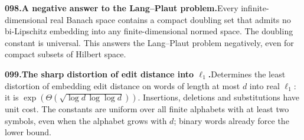 \documentclass[11pt,a4paper]{article}
\begin{document}
  \par \begin{minipage}{\linewidth}
  \fontsize{10.5}{12.6}\selectfont\RaggedRight
  \hypertarget{result 098}{}
  {\bfseries\textcolor{muted}{098.}\enspace A negative answer to the Lang--Plaut problem.}\enspace Every infinite-dimensional real Banach space contains a compact doubling set that admits no bi-Lipschitz embedding into any finite-dimensional normed space. The doubling constant is universal. This answers the Lang--Plaut problem negatively, even for compact subsets of Hilbert space.\par
  \end{minipage}\par\vspace{5pt}



  \par \begin{minipage}{\linewidth}
  \fontsize{10.5}{12.6}\selectfont\RaggedRight
  \hypertarget{result 099}{}
  {\bfseries\textcolor{muted}{099.}\enspace The sharp distortion of edit distance into $\ell_1$.}\enspace Determines the least distortion of embedding edit distance on words of length at most $d$ into real $\ell_1$: it is $\exp(\Theta(\sqrt{\log d\,\log\log d}))$. Insertions, deletions and substitutions have unit cost. The constants are uniform over all finite alphabets with at least two symbols, even when the alphabet grows with $d$; binary words already force the lower bound.\par
  \end{minipage}\par\vspace{5pt}
\end{document}
